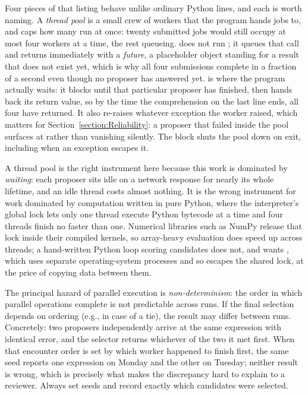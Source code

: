 Four pieces of that listing behave unlike ordinary Python lines, and each is worth naming.
A \emph{thread pool} is a small crew of workers that the program hands jobs to, and  caps how many run at once: twenty submitted jobs would still occupy at most four workers at a time, the rest queueing.
 does not run ; it queues that call and returns immediately with a \emph{future}, a placeholder object standing for a result that does not exist yet, which is why all four submissions complete in a fraction of a second even though no proposer has answered yet.
 is where the program actually waits: it blocks until that particular proposer has finished, then hands back its return value, so by the time the comprehension on the last line ends, all four have returned.
It also re-raises whatever exception the worker raised, which matters for Section~\ref{section:Reliability}: a proposer that failed inside the pool surfaces at  rather than vanishing silently.
The  block shuts the pool down on exit, including when an exception escapes it.

\begin{remark}
A thread pool is the right instrument here because this work is dominated by \emph{waiting}: each proposer sits idle on a network response for nearly its whole lifetime, and an idle thread costs almost nothing.
It is the wrong instrument for work dominated by computation written in pure Python, where the interpreter's global lock lets only one thread execute Python bytecode at a time and four threads finish no faster than one.
Numerical libraries such as NumPy release that lock inside their compiled kernels, so array-heavy evaluation does speed up across threads; a hand-written Python loop scoring candidates does not, and wants , which uses separate operating-system processes and so escapes the shared lock, at the price of copying data between them.
\end{remark}

The principal hazard of parallel execution is \emph{non-determinism}: the order in which parallel operations complete is not predictable across runs.
If the final selection depends on ordering (e.g., in case of a tie), the result may differ between runs.
Concretely: two proposers independently arrive at the same expression with identical error, and the selector returns whichever of the two it met first.
When that encounter order is set by which worker happened to finish first, the same seed reports one expression on Monday and the other on Tuesday; neither result is wrong, which is precisely what makes the discrepancy hard to explain to a reviewer.
Always set seeds and record exactly which candidates were selected.

